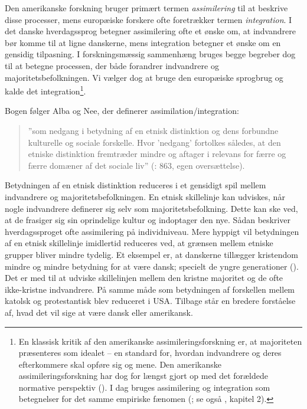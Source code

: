 \documentclass[
]{book}
\begin{document}
Den amerikanske forskning bruger primært termen \emph{assimilering} til at beskrive disse processer, mens europæiske forskere ofte foretrækker termen \emph{integration}. I det danske hverdagssprog betegner assimilering ofte et ønske om, at indvandrere bør komme til at ligne danskerne, mens integration betegner et ønske om en gensidig tilpasning. I forskningsmæssig sammenhæng bruges begge begreber dog til at betegne processen, der både forandrer indvandrere og majoritetsbefolkningen. Vi vælger dog at bruge den europæiske sprogbrug og kalde det integration\footnote{En klassisk kritik af den amerikanske assimileringsforskning er, at majoriteten præsenteres som idealet -- en standard for, hvordan indvandrere og deres efterkommere skal opføre sig og mene. Den amerikanske assimileringsforskning har dog for længst gjort op med det forældede normative perspektiv (). I dag bruges assimilering og integration som betegnelser for det samme empiriske fænomen (; se også , kapitel 2).}.

Bogen følger Alba og Nee, der definerer assimilation/integration:

\begin{quote}
''som nedgang i betydning af en etnisk distinktion og dens forbundne kulturelle og sociale forskelle. Hvor 'nedgang' fortolkes således, at den etniske distinktion fremtræder mindre og aftager i relevans for færre og færre domæner af det sociale liv'' (: 863, egen oversættelse).
\end{quote}

Betydningen af en etnisk distinktion reduceres i et gensidigt spil mellem indvandrere og majoritetsbefolkningen. En etnisk skillelinje kan udviskes, når nogle indvandrere definerer sig selv som majoritetsbefolkning. Dette kan ske ved, at de frasiger sig sin oprindelige kultur og indoptager den nye. Sådan beskriver hverdagssproget ofte assimilering på individniveau. Mere hyppigt vil betydningen af en etnisk skillelinje imidlertid reduceres ved, at grænsen mellem etniske grupper bliver mindre tydelig. Et eksempel er, at danskerne tillægger kristendom mindre og mindre betydning for at være dansk; specielt de yngre generationer (). Det er med til at udviske skillelinjen mellem den kristne majoritet og de ofte ikke-kristne indvandrere. På samme måde som betydningen af forskellen mellem katolsk og protestantisk blev reduceret i USA. Tilbage står en bredere forståelse af, hvad det vil sige at være dansk eller amerikansk.
\end{document}
